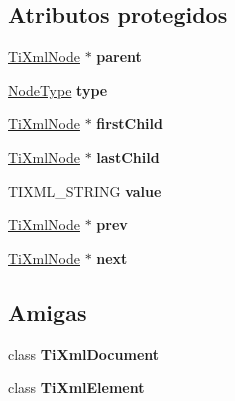 \subsection*{Atributos protegidos}
\begin{DoxyCompactItemize}
\item 
\hypertarget{class_ti_xml_node_a662c4de61244e4fa5bd4e2d8c63143a5}{\hyperlink{class_ti_xml_node}{Ti\-Xml\-Node} $\ast$ {\bfseries parent}}\label{class_ti_xml_node_a662c4de61244e4fa5bd4e2d8c63143a5}

\item 
\hypertarget{class_ti_xml_node_a2619c6379181c16ba95ae6922e2ca839}{\hyperlink{class_ti_xml_node_a836eded4920ab9e9ef28496f48cd95a2}{Node\-Type} {\bfseries type}}\label{class_ti_xml_node_a2619c6379181c16ba95ae6922e2ca839}

\item 
\hypertarget{class_ti_xml_node_af749fb7f22010b80e8f904c32653d50e}{\hyperlink{class_ti_xml_node}{Ti\-Xml\-Node} $\ast$ {\bfseries first\-Child}}\label{class_ti_xml_node_af749fb7f22010b80e8f904c32653d50e}

\item 
\hypertarget{class_ti_xml_node_a5b30756d21b304580d22a841ec9d61f8}{\hyperlink{class_ti_xml_node}{Ti\-Xml\-Node} $\ast$ {\bfseries last\-Child}}\label{class_ti_xml_node_a5b30756d21b304580d22a841ec9d61f8}

\item 
\hypertarget{class_ti_xml_node_aead528b3cedc33c16a6c539872c7cc8b}{T\-I\-X\-M\-L\-\_\-\-S\-T\-R\-I\-N\-G {\bfseries value}}\label{class_ti_xml_node_aead528b3cedc33c16a6c539872c7cc8b}

\item 
\hypertarget{class_ti_xml_node_a9c5370ea2cbfd9f0e0f7b30a57fd68f5}{\hyperlink{class_ti_xml_node}{Ti\-Xml\-Node} $\ast$ {\bfseries prev}}\label{class_ti_xml_node_a9c5370ea2cbfd9f0e0f7b30a57fd68f5}

\item 
\hypertarget{class_ti_xml_node_a2f329cc993d2d34df76e17dcbb776b45}{\hyperlink{class_ti_xml_node}{Ti\-Xml\-Node} $\ast$ {\bfseries next}}\label{class_ti_xml_node_a2f329cc993d2d34df76e17dcbb776b45}

\end{DoxyCompactItemize}
\subsection*{Amigas}
\begin{DoxyCompactItemize}
\item 
\hypertarget{class_ti_xml_node_a173617f6dfe902cf484ce5552b950475}{class {\bfseries Ti\-Xml\-Document}}\label{class_ti_xml_node_a173617f6dfe902cf484ce5552b950475}

\item 
\hypertarget{class_ti_xml_node_ab6592e32cb9132be517cc12a70564c4b}{class {\bfseries Ti\-Xml\-Element}}\label{class_ti_xml_node_ab6592e32cb9132be517cc12a70564c4b}

\end{DoxyCompactItemize}
